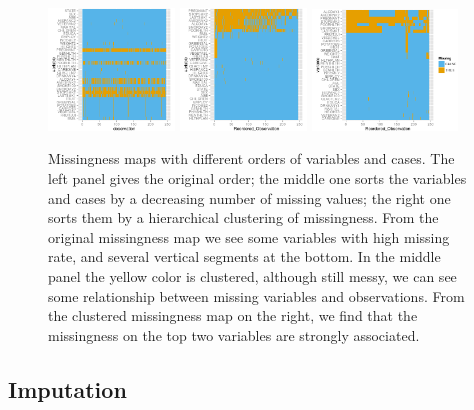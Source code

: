 \documentclass[article]{jss}
\begin{document}
\begin{center}
\begin{figure}[h]
\begin{centering}
\includegraphics[width=0.3\textwidth]{graph/fig5-3-missingmap-1}
\includegraphics[width=0.3\textwidth]{graph/fig5-3-missingmap-2}
\includegraphics[width=0.345\textwidth]{graph/fig5-3-missingmap-3}
\par\end{centering}
\caption{Missingness maps with different orders of variables and cases. The left panel gives the original order; the middle one sorts the variables and cases by a decreasing number of missing values; the right one sorts them by a hierarchical clustering of missingness. From the original missingness map we see some variables with high missing rate, and several vertical segments at the bottom. In the middle panel the yellow color is clustered, although still messy, we can see some relationship between missing variables and observations. From the clustered missingness map on the right, we find that the missingness on the top two variables are strongly associated.}
\label{fig:missingmap}
\end{figure}
\par\end{center}

\subsection{Imputation}\label{imputation}
\end{document}
